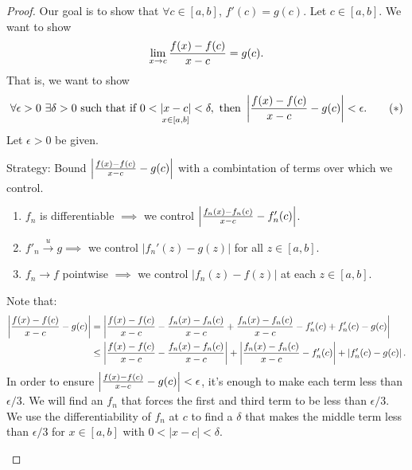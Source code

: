 \begin{proof}
    Our goal is to show that $\forall c \in [a,b]$, $f'(c) = g(c).$ Let $c \in [a,b].$ We want to show
    $$\lim \limits_{x \to c} \frac{f(x) - f(c)}{x-c} = g(c).$$
    That is, we want to show
    \[
        \forall \epsilon > 0 ~\exists \delta > 0 \text{ such that } \text{if } 0 < \underset{x\in [a,b]}{|x-c|} < \delta, \text{ then } \left|\frac{f(x) - f(c)}{x - c} - g(c)\right| < \epsilon.
        \tag{$*$}
    \]
    Let $\epsilon > 0$ be given.
    \begin{info}
        Strategy: Bound $\left|\frac{f(x) - f(c)}{x - c}-g(c)\right|$ with a combintation of terms over which we control.
        \begin{enumerate}[$*$)]
            \item $f_n$ is differentiable $\implies$ we control $\left|\frac{f_n(x) - f_n(c)}{x - c}-f_n'(c)\right|$.
            \item $f'_n \overset{u}{\to} g \implies$ we control $|f_n'(z)-g(z)|$ for all $z \in [a,b]$.
            \item $f_n \to f$ pointwise $\implies$ we control $|f_n(z) - f(z)|$ at each $z \in [a,b].$
        \end{enumerate}
        Note that:
        \begin{align*}
            \left|\frac{f(x) - f(c)}{x - c}-g(c)\right| &= \left|\frac{f(x) - f(c)}{x - c}-\frac{f_n(x) - f_n(c)}{x - c}+\frac{f_n(x) - f_n(c)}{x - c}-f_n'(c) + f_n'(c)-g(c)\right| \\
            &\leq \left|\frac{f(x) - f(c)}{x - c}-\frac{f_n(x) - f_n(c)}{x - c}\right| + \left|\frac{f_n(x) - f_n(c)}{x - c}-f_n'(c)\right| + \left| f_n'(c)-g(c)\right|.
        \end{align*}
        In order to ensure $\left|\frac{f(x) - f(c)}{x - c}-g(c)\right| < \epsilon$, it's enough to make each term less than $\epsilon / 3$. We will find an $f_n$ that forces the first and third term to be less than $\epsilon / 3.$ We use the differentiability of $f_n$ at $c$ to find a $\delta$ that makes the middle term less than $\epsilon / 3$ for $x \in [a,b]$ with $0 < |x-c| < \delta.$
    \end{info}


\end{proof}

